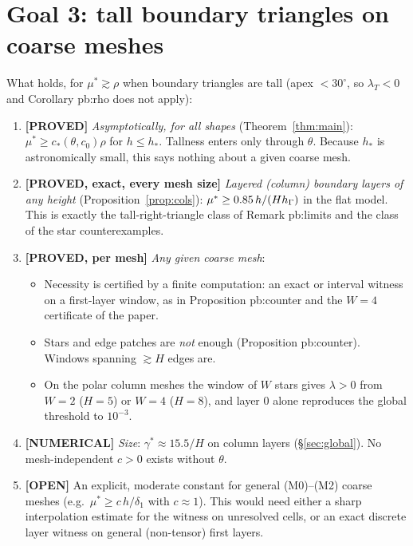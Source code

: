 \documentclass[11pt]{article}
\theoremstyle{remark}\newtheorem{remark}[theorem]{Remark}
\newcommand{\lab}[1]{\textbf{[#1]}}
\begin{document}
\section{Goal 3: tall boundary triangles on coarse meshes}\label{sec:tall}
What holds, for $\mu^\ast\gtrsim\rho$ when boundary triangles are tall (apex $<30^\circ$, so $\lambda_T<0$ and
Corollary pb:rho does not apply):
\begin{enumerate}[label=(\alph*)]
\item \lab{PROVED} \emph{Asymptotically, for all shapes} (Theorem~\ref{thm:main}): $\mu^\ast\ge c_\ast(\theta,c_0)\rho$ for
  $h\le h_\ast$. Tallness enters only through $\theta$. Because $h_\ast$ is astronomically small, this says nothing about a
  given coarse mesh.
\item \lab{PROVED, exact, every mesh size} \emph{Layered (column) boundary layers of any height} (Proposition~\ref{prop:cols}):
  $\mu^\ast\ge0.85\,h/(Hh_\Gamma)$ in the flat model. This is exactly the tall-right-triangle class of Remark pb:limits and the
  class of the star counterexamples.
\item \lab{PROVED, per mesh} \emph{Any given coarse mesh}:
  \begin{itemize}
  \item Necessity is certified by a finite computation: an exact or interval witness on a first-layer window, as in
    Proposition pb:counter and the $W=4$ certificate of the paper.
  \item Stars and edge patches are \emph{not} enough (Proposition pb:counter). Windows spanning $\gtrsim H$ edges are.
  \item On the polar column meshes the window of $W$ stars gives $\lambda>0$ from $W=2$ ($H=5$) or $W=4$ ($H=8$), and layer 0
    alone reproduces the global threshold to $10^{-3}$.
  \end{itemize}
\item \lab{NUMERICAL} \emph{Size}: $\gamma^\ast\approx15.5/H$ on column layers (\S\ref{sec:global}). No mesh-independent
  $c>0$ exists without $\theta$.
\item \lab{OPEN} An explicit, moderate constant for general (M0)--(M2) coarse meshes (e.g.\ $\mu^\ast\ge c\,h/\delta_1$ with
  $c\approx1$). This would need either a sharp interpolation estimate for the witness on unresolved cells, or an exact
  discrete layer witness on general (non-tensor) first layers.
\end{enumerate}
\end{document}
